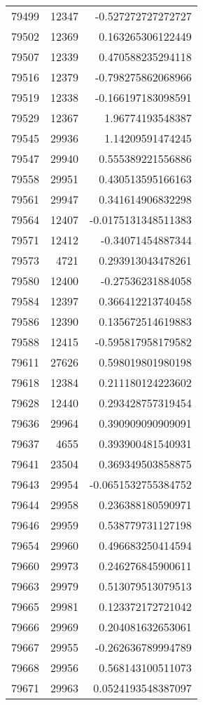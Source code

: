 \begin{tabular}{r | r | r}
79499 & 12347 & -0.527272727272727 \\
79502 & 12369 & 0.163265306122449 \\
79507 & 12339 & 0.470588235294118 \\
79516 & 12379 & -0.798275862068966 \\
79519 & 12338 & -0.166197183098591 \\
79529 & 12367 & 1.96774193548387 \\
79545 & 29936 & 1.14209591474245 \\
79547 & 29940 & 0.555389221556886 \\
79558 & 29951 & 0.430513595166163 \\
79561 & 29947 & 0.341614906832298 \\
79564 & 12407 & -0.0175131348511383 \\
79571 & 12412 & -0.34071454887344 \\
79573 & 4721 & 0.293913043478261 \\
79580 & 12400 & -0.27536231884058 \\
79584 & 12397 & 0.366412213740458 \\
79586 & 12390 & 0.135672514619883 \\
79588 & 12415 & -0.595817958179582 \\
79611 & 27626 & 0.598019801980198 \\
79618 & 12384 & 0.211180124223602 \\
79628 & 12440 & 0.293428757319454 \\
79636 & 29964 & 0.390909090909091 \\
79637 & 4655 & 0.393900481540931 \\
79641 & 23504 & 0.369349503858875 \\
79643 & 29954 & -0.0651532755384752 \\
79644 & 29958 & 0.236388180590971 \\
79646 & 29959 & 0.538779731127198 \\
79654 & 29960 & 0.496683250414594 \\
79660 & 29973 & 0.246276845900611 \\
79663 & 29979 & 0.513079513079513 \\
79665 & 29981 & 0.123372172721042 \\
79666 & 29969 & 0.204081632653061 \\
79667 & 29955 & -0.262636789994789 \\
79668 & 29956 & 0.568143100511073 \\
79671 & 29963 & 0.0524193548387097 \\

\end{tabular}
